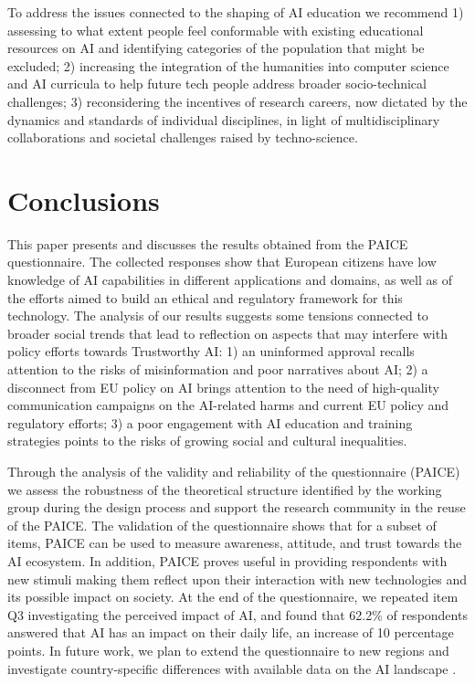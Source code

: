 \documentclass{article}
\begin{document}
To address the issues connected to the shaping of AI education we recommend 1) assessing to what extent people feel conformable with existing educational resources on AI and identifying categories of the population that might be excluded; 2) increasing the integration of the humanities into computer science and AI curricula to help future tech people address broader socio-technical challenges; 3) reconsidering the incentives of research careers, now dictated by the dynamics and standards of individual disciplines, in light of multidisciplinary collaborations and societal challenges raised by techno-science.

\section{Conclusions}
\label{conclude}
This paper presents and discusses the results obtained from the PAICE questionnaire. 
The collected responses show that European citizens have low knowledge of AI capabilities in different applications and domains, as well as of the efforts aimed to build an ethical and regulatory framework for this technology. The analysis of our results suggests some tensions connected to broader social trends that lead to reflection on aspects that may interfere with policy efforts towards Trustworthy AI: 1) an uninformed approval recalls attention to the risks of misinformation and poor narratives about AI; 2) a disconnect from EU policy on AI brings attention to the need of high-quality communication campaigns on the AI-related harms and current EU policy and regulatory efforts; 3) a poor engagement with AI education and training strategies points to the risks of growing social and cultural inequalities.  

Through the analysis of the validity and reliability of the questionnaire (PAICE) we assess the robustness of the theoretical structure identified by the working group during the design process and support the research community in the reuse of the PAICE. The validation of the questionnaire shows that for a subset of items, PAICE can be used to measure awareness, attitude, and trust towards the AI ecosystem.
In addition, PAICE proves useful in providing respondents with new stimuli making them reflect upon their interaction with new technologies and its possible impact on society. At the end of the questionnaire, we repeated item Q3 investigating the perceived impact of AI, and found that 62.2\% of respondents answered that AI has an impact on their daily life, an increase of 10 percentage points.
In future work, we plan to extend the questionnaire to new regions and investigate country-specific differences with available data on the AI landscape \cite{AIwatch2021}.
\end{document}
